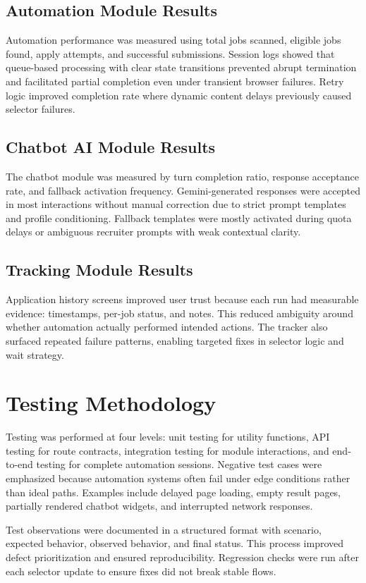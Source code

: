 \documentclass[12pt,a4paper,oneside]{report}
\begin{document}
\subsection{Automation Module Results}
Automation performance was measured using total jobs scanned, eligible jobs found, apply attempts, and successful submissions. Session logs showed that queue-based processing with clear state transitions prevented abrupt termination and facilitated partial completion even under transient browser failures. Retry logic improved completion rate where dynamic content delays previously caused selector failures.

\subsection{Chatbot AI Module Results}
The chatbot module was measured by turn completion ratio, response acceptance rate, and fallback activation frequency. Gemini-generated responses were accepted in most interactions without manual correction due to strict prompt templates and profile conditioning. Fallback templates were mostly activated during quota delays or ambiguous recruiter prompts with weak contextual clarity.

\subsection{Tracking Module Results}
Application history screens improved user trust because each run had measurable evidence: timestamps, per-job status, and notes. This reduced ambiguity around whether automation actually performed intended actions. The tracker also surfaced repeated failure patterns, enabling targeted fixes in selector logic and wait strategy.

\section{Testing Methodology}
Testing was performed at four levels: unit testing for utility functions, API testing for route contracts, integration testing for module interactions, and end-to-end testing for complete automation sessions. Negative test cases were emphasized because automation systems often fail under edge conditions rather than ideal paths. Examples include delayed page loading, empty result pages, partially rendered chatbot widgets, and interrupted network responses.

Test observations were documented in a structured format with scenario, expected behavior, observed behavior, and final status. This process improved defect prioritization and ensured reproducibility. Regression checks were run after each selector update to ensure fixes did not break stable flows.
\end{document}
